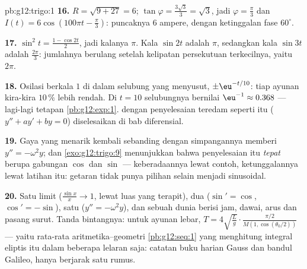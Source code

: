 \begin{solution}{pb:g12:trigo:1}
\textbf{16.} $R = \sqrt{9 + 27} = 6$;
$\tan\varphi = \frac{3\sqrt3}{3} = \sqrt3$, jadi
$\varphi = \frac\pi3$ dan $I(t) = 6\cos\left(100\pi t -
\frac\pi3\right)$: puncaknya $6$ ampere, dengan ketinggalan fase $60^\circ$.

\textbf{17.} $\sin^2 t = \frac{1 - \cos 2t}{2}$, jadi kalanya
$\pi$. Kala $\sin 2t$ adalah $\pi$, sedangkan kala $\sin 3t$ adalah
$\frac{2\pi}{3}$: jumlahnya berulang setelah kelipatan persekutuan
terkecilnya, yaitu $2\pi$.

\textbf{18.} Osilasi berkala $1$ di dalam selubung yang menyusut,
$\pm\eu^{-t/10}$: tiap ayunan kira-kira $10\,\%$ lebih rendah. Di
$t = 10$ selubungnya bernilai $\eu^{-1} \approx 0.368$ --- lagi-lagi
tetapan \cref{pb:g12:exp:1}.  dengan penyelesaian
teredam seperti itu ($y'' + a y' + b y = 0$) diselesaikan di bab
 diferensial.

\textbf{19.} Gaya yang menarik kembali sebanding dengan
simpangannya memberi $y'' = -\omega^2 y$; dan
\cref{exo:g12:trigo:9} menunjukkan bahwa penyelesaian  itu
\emph{tepat} berupa gabungan $\cos$ dan $\sin$ ---
keberadaannya lewat contoh, ketunggalannya lewat latihan itu: getaran
tidak punya pilihan selain menjadi sinusoidal.

\textbf{20.} Satu limit ($\frac{\sin x}{x} \to 1$, lewat
luas yang terapit), dua  ($\sin' = \cos$,
$\cos' = -\sin$), satu  ($y'' = -\omega^2 y$), dan sebuah dunia
berisi jam, dawai, arus dan pasang surut. Tanda bintangnya: untuk ayunan
lebar, $T = 4\sqrt{\frac Lg} \cdot
\frac{\pi/2}{M(1, \cos(\theta_0/2))}$ --- yaitu
rata-rata aritmetika--geometri \cref{pb:g12:seq:1} yang menghitung
integral eliptis itu dalam beberapa lelaran saja: catatan buku harian Gauss
dan bandul Galileo, hanya berjarak satu rumus.

\end{solution}
